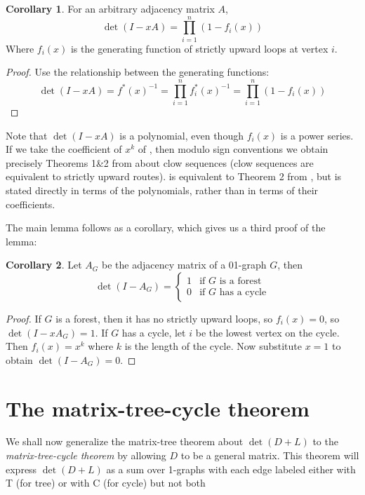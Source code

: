 \documentclass[a4paper, 11pt]{article}
\theoremstyle{definition}
\newtheorem{corollary}{Corollary}[theorem]
\begin{document}
\begin{corollary}
  \label{cor:strictlyupwardloops}
  For an arbitrary adjacency matrix $A$,
  \[ \det(I - xA) = \prod_{i = 1}^n (1 - f_i(x)) \]
  Where $f_i(x)$ is the generating function of strictly upward loops at vertex $i$.
\end{corollary}
\begin{proof}
  Use the relationship between the generating functions:
  \[
    \det(I - xA) = f^{*}(x)^{-1} = \prod_{i=1}^n f^{*}_i(x)^{-1} = \prod_{i=1}^n (1 - f_i(x))
  \]
\end{proof}

Note that $\det(I - xA)$ is a polynomial, even though $f_i(x)$ is a power series. If we take the coefficient of $x^k$ of , then modulo sign conventions we obtain precisely Theorems 1\&2 from \cite{Rote2001} about clow sequences (clow sequences are equivalent to strictly upward routes).  is equivalent to Theorem 2 from \cite{Rote2001}, but is stated directly in terms of the polynomials, rather than in terms of their coefficients.

The main lemma follows as a corollary, which gives us a third proof of the lemma:

\begin{corollary}
  Let $A_G$ be the adjacency matrix of a 01-graph $G$, then
  \[
    \det(I-A_G) = \begin{cases}
      1 & \text{if $G$ is a forest}\\
      0 & \text{if $G$ has a cycle}
    \end{cases}
  \]
\end{corollary}
\begin{proof}
  If $G$ is a forest, then it has no strictly upward loops, so $f_i(x) = 0$, so $\det(I - xA_G) = 1$. If $G$ has a cycle, let $i$ be the lowest vertex on the cycle. Then $f_i(x) = x^k$ where $k$ is the length of the cycle. Now substitute $x = 1$ to obtain $\det(I - A_G) = 0$.
\end{proof}

\section{The matrix-tree-cycle theorem}

We shall now generalize the matrix-tree theorem about $\det(D + L)$ to the \emph{matrix-tree-cycle theorem} by allowing $D$ to be a general matrix. This theorem will express $\det(D + L)$ as a sum over 1-graphs with each edge labeled either with T (for tree) or with C (for cycle) but not both
\end{document}
